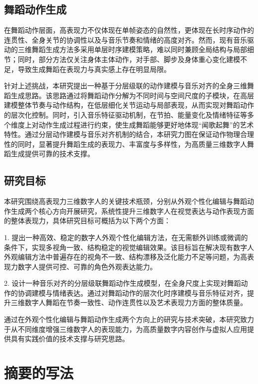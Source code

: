 \subsection{舞蹈动作生成}
在舞蹈动作层面，高表现力不仅体现在单帧姿态的自然性，更体现在长时序动作的连贯性、全身关节的协调性以及与音乐节奏和情绪的高度对齐。然而，现有音乐驱动的三维舞蹈生成方法多采用单层时序建模策略，难以同时兼顾全局结构与局部细节；同时，部分方法仅关注身体主体动作，对手部、脚步及身体重心变化建模不足，导致生成舞蹈在表现力与真实感上存在明显局限。

针对上述挑战，本研究提出一种基于分层级联的动作建模与音乐对齐的全身三维舞蹈生成思路。该思路通过将舞蹈动作分解为不同时间与空间尺度的子模块，在高层建模整体节奏与动作结构，在低层细化关节运动与局部表现，从而实现对舞蹈动作的层次化控制。同时，引入音乐特征驱动机制，在节拍、能量变化及情绪特征等多个维度上对动作生成过程进行约束，使生成舞蹈能够更好地体现“闻歌起舞”的艺术特性。通过分层动作建模与音乐对齐机制的结合，本研究力图在保证动作物理合理性的同时，显著提升舞蹈生成的表现力、丰富度与多样性，为高质量三维数字人舞蹈生成提供可靠的技术支撑。

\subsection{研究目标}
本研究围绕高表现力三维数字人的关键技术瓶颈，分别从外观个性化编辑与舞蹈动作生成两个核心方向开展研究，系统性提升三维数字人在视觉表达与动作表现方面的整体表现力，具体研究目标可概括为以下两个方面：

1. 提出一种高效、稳定的数字人外观个性化编辑方法，在无需额外训练或微调的条件下，实现多视角一致、结构稳定的视觉编辑效果。该目标旨在解决现有数字人外观编辑方法中普遍存在的视角不一致、结构漂移及泛化能力不足等问题，为高表现力数字人提供可控、可靠的角色外观表达能力。

2. 设计一种音乐对齐的分层级联舞蹈动作生成模型，在全身尺度上实现对舞蹈动作的协调建模与情绪表达。通过对舞蹈动作的层次化时序建模与音乐特征对齐，提升三维数字人舞蹈在节奏一致性、动作连贯性以及艺术表现力方面的整体质量。

通过在外观个性化编辑与舞蹈动作生成两个方向上的研究与技术突破，本研究致力于从不同维度增强三维数字人的表现能力，为高质量数字内容创作与虚拟人应用提供具有实践价值的技术支撑与研究思路。



\iffalse


\section{摘要的写法}

